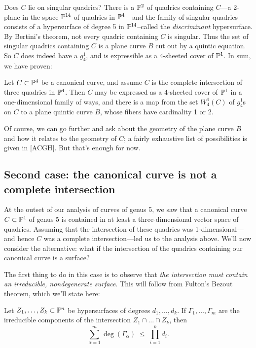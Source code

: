 Does $C$ lie on singular quadrics? There is a ${\mathbb P}^2$ of quadrics containing $C$---a 2-plane in the space ${\mathbb P}^{14}$ of quadrics in ${\mathbb P}^4$---and the family of singular quadrics  consists of a  hypersurface of degree 5 in ${\mathbb P}^{14}$--called the \emph{discriminant} hypersurface. By Bertini's theorem, not every quadric containing $C$ is singular. Thus the set of singular quadrics containing $C$ is a plane curve $B$ cut out by a quintic equation. So $C$ does indeed have a $g^1_4$, and is expressible as a 4-sheeted cover of ${\mathbb P}^1$. In sum, we have proven:

\begin{proposition}
Let $C \subset {\mathbb P}^4$ be a canonical curve, and assume $C$ is the complete intersection of three quadrics in ${\mathbb P}^4$. Then $C$ may be expressed as a 4-sheeted cover of ${\mathbb P}^1$ in a one-dimensional family of ways, and there is a map from the set $W^1_4(C)$ of $g^1_4$s on $C$ to a plane quintic curve $B$, whose fibers have cardinality 1 or 2.
\end{proposition}

Of course, we can go further and ask about the geometry of the plane curve $B$ and how it relates to the geometry of $C$; a fairly exhaustive list of possibilities is given in \cite{****} [ACGH]. But that's enough for now.

\subsection{Second case: the canonical curve is not a complete intersection}

At the outset of our analysis of curves of genus 5, we saw that a canonical curve $C \subset {\mathbb P}^4$ of genus 5 is contained in at least a three-dimensional vector space of quadrics. Assuming that the intersection of these quadrics was 1-dimensional---and hence $C$ was a complete intersection---led us to the analysis above. We'll now consider the alternative: what if the intersection of the quadrics containing our canonical curve is a surface?

The first thing to do in this case is to observe that \emph{the intersection must contain an irreducible, nondegenerate surface}. This will follow from Fulton's Bezout theorem, which we'll state here:

\begin{theorem}
Let $Z_1,\dots, Z_k \subset {\mathbb P}^n$ be hypersurfaces of degrees $d_1,\dots,d_k$. If $\Gamma_1,\dots,\Gamma_m$ are the irreducible components of the intersection $Z_1 \cap \dots \cap Z_k$, then
$$
\sum_{\alpha = 1}^m \deg(\Gamma_\alpha) \; \leq \; \prod_{i=1}^k d_i.
$$
\end{theorem}

